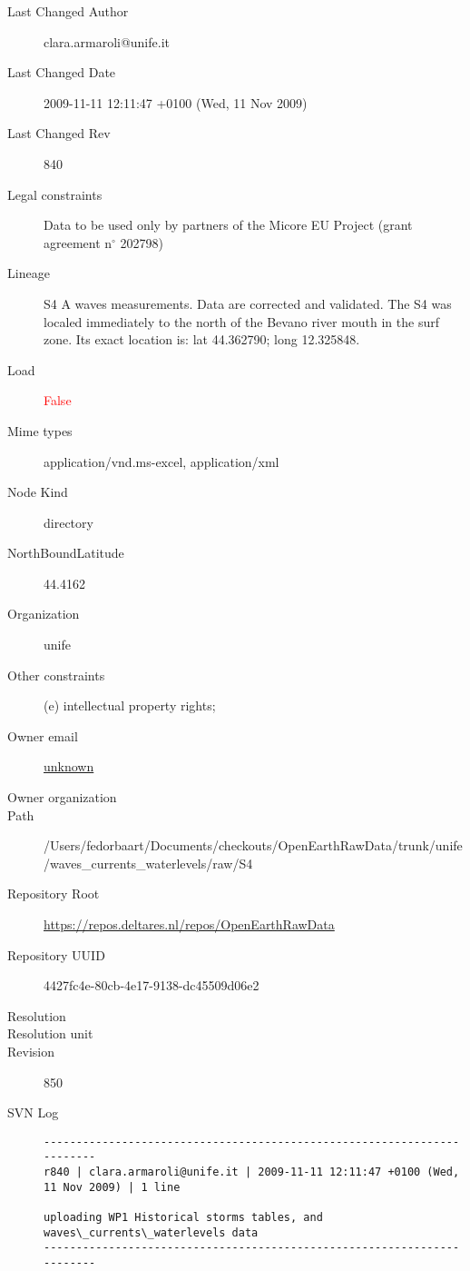 \documentclass[9]{report}
\begin{document}
\begin{description}
  \item[Last Changed Author] clara.armaroli@unife.it
  \item[Last Changed Date] 2009-11-11 12:11:47 +0100 (Wed, 11 Nov 2009)
  \item[Last Changed Rev] 840
  \item[Legal constraints] Data to be used only by partners of the Micore EU Project (grant agreement n\mbox{$^\circ$} 202798)
  \item[Lineage] S4 A waves measurements. Data are corrected and validated. The S4 was localed immediately to the north of the Bevano river mouth in the surf zone. Its exact location is: lat 44.362790; long 12.325848.
  \item[Load] \textcolor{red}{False}
  \item[Mime types] application/vnd.ms-excel, application/xml
  \item[Node Kind] directory
  \item[NorthBoundLatitude] 44.4162
  \item[Organization] unife
  \item[Other constraints] (e) intellectual property rights;
  \item[Owner email] \href{mailto:unknown}{unknown}
  \item[Owner organization] 
  \item[Path] /Users/fedorbaart/Documents/checkouts/OpenEarthRawData/trunk/unife/waves\_currents\_waterlevels/raw/S4
  \item[Repository Root] \href{https://repos.deltares.nl/repos/OpenEarthRawData}{https://repos.deltares.nl/repos/OpenEarthRawData}
  \item[Repository UUID] 4427fc4e-80cb-4e17-9138-dc45509d06e2
  \item[Resolution] 
  \item[Resolution unit] 
  \item[Revision] 850
  \item[SVN Log] \begin{verbatim}
------------------------------------------------------------------------
r840 | clara.armaroli@unife.it | 2009-11-11 12:11:47 +0100 (Wed, 11 Nov 2009) | 1 line

uploading WP1 Historical storms tables, and waves\_currents\_waterlevels data
------------------------------------------------------------------------


\end{verbatim}
\end{description}
\end{document}
